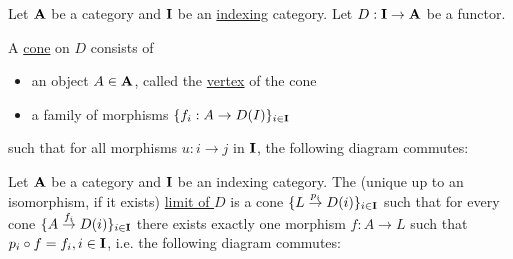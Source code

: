 \begin{definition}\label{def:categorical_cone}\cite[definition 5.1.19(a)]{Leinster2014}
  Let $\operatorname{\mathbf{A}}$ be a category and $\operatorname{\mathbf{I}}$ be an \uline{indexing} category. Let $D: \operatorname{\mathbf{I}} \to \operatorname{\mathbf{A}}$ be a functor.

  A \uline{cone} on $D$ consists of
  \begin{itemize}
    \item an object $A \in \operatorname{\mathbf{A}}$, called the \uline{vertex} of the cone
    \item a family of morphisms $\{ f_i: A \to D(I) \}_{i \in \operatorname{\mathbf{I}}}$
  \end{itemize}
  such that for all morphisms $u: i \to j$ in $\operatorname{\mathbf{I}}$, the following diagram commutes:
  \begin{center}
  \end{center}
\end{definition}

\begin{definition}\label{def:categorical_limit}\cite[definition 5.1.19(b)]{Leinster2014}
  Let $\operatorname{\mathbf{A}}$ be a category and $\operatorname{\mathbf{I}}$ be an indexing category. The (unique up to an isomorphism, if it exists) \uline{limit of $D$} is a cone $\{ L \overset {p_i} \to D(i) \}_{i \in \operatorname{\mathbf{I}}}$ such that for every cone $\{ A \overset {f_i} \to D(i) \}_{i \in \operatorname{\mathbf{I}}}$ there exists exactly one morphism $f: A \to L$ such that $p_i \circ f = f_i, i \in \operatorname{\mathbf{I}}$, i.e. the following diagram commutes:
  \begin{center}
  \end{center}
\end{definition}

